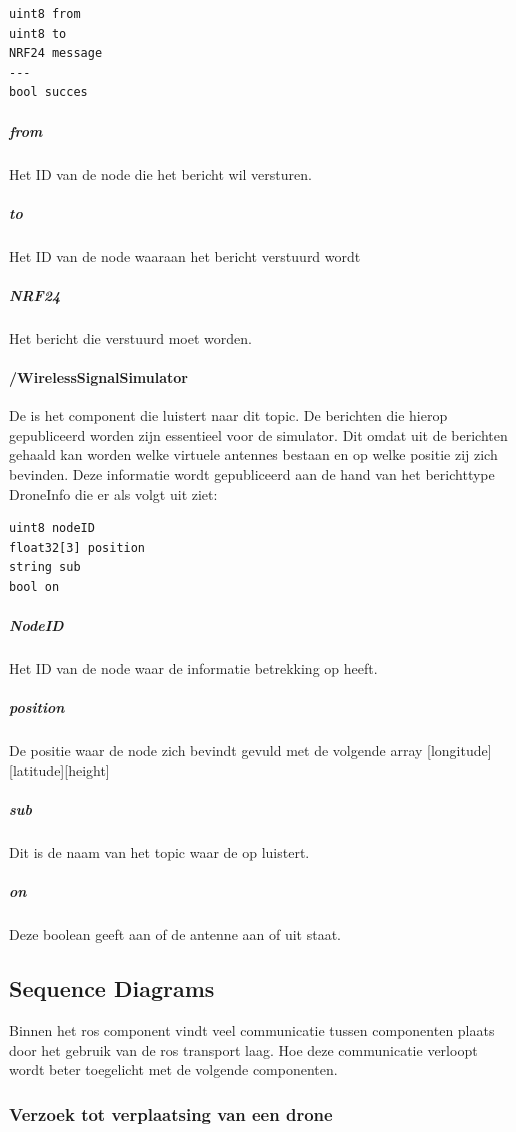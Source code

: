 \documentclass[a4paper, 11pt, oneside]{report}
\begin{document}
\begin{lstlisting}
uint8 from
uint8 to 
NRF24 message
---
bool succes
\end{lstlisting}

\subparagraph{from} Het ID van de node die het bericht wil versturen.
\subparagraph{to} Het ID van de node waaraan het bericht verstuurd wordt
\subparagraph{NRF24} Het bericht die verstuurd moet worden.


\paragraph{/WirelessSignalSimulator}
\label{DetailedDesign:ros:intern:rosinterfaces:topic:signalsimulator}
De  is het component die luistert naar dit topic. 
De berichten die hierop gepubliceerd worden zijn essentieel voor de simulator.
Dit omdat uit de berichten gehaald kan worden welke virtuele antennes bestaan en op welke positie zij zich bevinden.
Deze informatie wordt gepubliceerd aan de hand van het berichttype DroneInfo die er als volgt uit ziet:

\begin{lstlisting}
uint8 nodeID
float32[3] position
string sub
bool on
\end{lstlisting}

\subparagraph{NodeID} Het ID van de node waar de informatie betrekking op heeft.
\subparagraph{position} De positie waar de node zich bevindt gevuld met de volgende array [longitude][latitude][height]
\subparagraph{sub} Dit is de naam van het topic waar de  op luistert.
\subparagraph{on} Deze boolean geeft aan of de antenne aan of uit staat.

\subsection{Sequence Diagrams}
\label{DetailedDesign:ros:sequence}

Binnen het ros component vindt veel communicatie tussen componenten plaats door het gebruik van de ros transport laag.
Hoe deze communicatie verloopt wordt beter toegelicht met de volgende componenten.

\subsubsection{Verzoek tot verplaatsing van een drone}
\label{DetailedDesign:ros:sequence:verplaatsingdrone}
\end{document}
